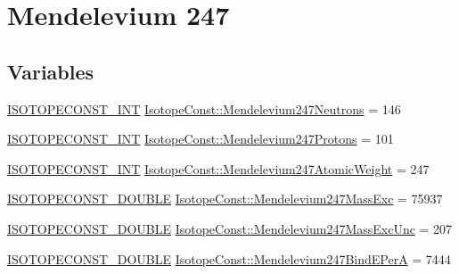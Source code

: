 \hypertarget{group___isotope_const-_mendelevium-_md247}{}\section{Mendelevium 247}
\label{group___isotope_const-_mendelevium-_md247}
\subsection*{Variables}
\begin{DoxyCompactItemize}
\item 
\mbox{\hyperlink{group___isotope_const-_macros_ga5f18360b3e99483a35c32d789e62621c}{I\+S\+O\+T\+O\+P\+E\+C\+O\+N\+S\+T\+\_\+\+I\+NT}} \mbox{\hyperlink{group___isotope_const-_mendelevium-_md247_ga297ce1c64a346aec97e002071b73c4d0}{Isotope\+Const\+::\+Mendelevium247\+Neutrons}} = 146
\item 
\mbox{\hyperlink{group___isotope_const-_macros_ga5f18360b3e99483a35c32d789e62621c}{I\+S\+O\+T\+O\+P\+E\+C\+O\+N\+S\+T\+\_\+\+I\+NT}} \mbox{\hyperlink{group___isotope_const-_mendelevium-_md247_gabfbcb632743788969e7d8dc5b63f354b}{Isotope\+Const\+::\+Mendelevium247\+Protons}} = 101
\item 
\mbox{\hyperlink{group___isotope_const-_macros_ga5f18360b3e99483a35c32d789e62621c}{I\+S\+O\+T\+O\+P\+E\+C\+O\+N\+S\+T\+\_\+\+I\+NT}} \mbox{\hyperlink{group___isotope_const-_mendelevium-_md247_ga467412412fb55f626763d7ab0ca869ed}{Isotope\+Const\+::\+Mendelevium247\+Atomic\+Weight}} = 247
\item 
\mbox{\hyperlink{group___isotope_const-_macros_ga8f45a7272ce02c0b4c65c44636ed719a}{I\+S\+O\+T\+O\+P\+E\+C\+O\+N\+S\+T\+\_\+\+D\+O\+U\+B\+LE}} \mbox{\hyperlink{group___isotope_const-_mendelevium-_md247_ga737feb1b15b2749e37bcdb96fde284e7}{Isotope\+Const\+::\+Mendelevium247\+Mass\+Exc}} = 75937
\item 
\mbox{\hyperlink{group___isotope_const-_macros_ga8f45a7272ce02c0b4c65c44636ed719a}{I\+S\+O\+T\+O\+P\+E\+C\+O\+N\+S\+T\+\_\+\+D\+O\+U\+B\+LE}} \mbox{\hyperlink{group___isotope_const-_mendelevium-_md247_ga1f8bdb43b2dcf7d8b2a0949e0e100ec8}{Isotope\+Const\+::\+Mendelevium247\+Mass\+Exc\+Unc}} = 207
\item 
\mbox{\hyperlink{group___isotope_const-_macros_ga8f45a7272ce02c0b4c65c44636ed719a}{I\+S\+O\+T\+O\+P\+E\+C\+O\+N\+S\+T\+\_\+\+D\+O\+U\+B\+LE}} \mbox{\hyperlink{group___isotope_const-_mendelevium-_md247_ga7045ba128e5c642512cdd4421af21f62}{Isotope\+Const\+::\+Mendelevium247\+Bind\+E\+PerA}} = 7444

\end{DoxyCompactItemize}
